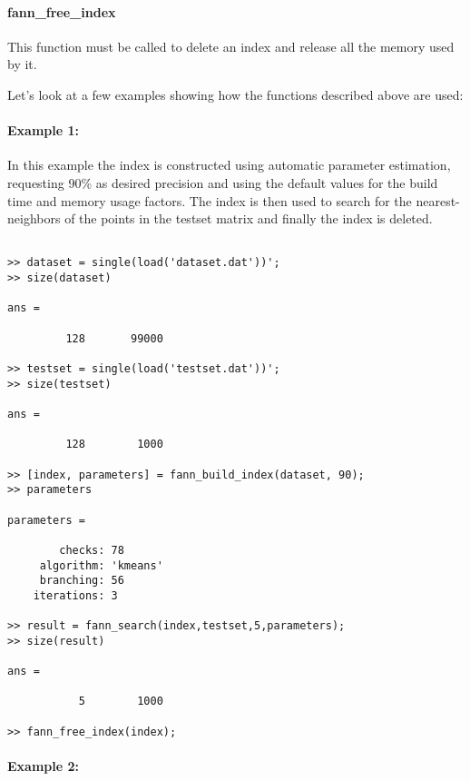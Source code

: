 \documentclass[letter,10pt]{article}
\begin{document}
\paragraph{fann\_free\_index}

This function must be called to delete an index and release all the memory used by it.

\bigskip

Let's look at a few examples showing how the functions described above are used:

\paragraph{Example 1:}

In this example the index is constructed using automatic parameter estimation, requesting 90\% as desired precision and using the default values for the build time and memory usage factors. The index is then used to search for the nearest-neighbors of the points in the testset matrix and finally the index is deleted.

\begin{Verbatim}[fontsize=\footnotesize,frame=single]

>> dataset = single(load('dataset.dat'))';
>> size(dataset)

ans =

         128       99000

>> testset = single(load('testset.dat'))';
>> size(testset)

ans =

         128        1000

>> [index, parameters] = fann_build_index(dataset, 90);
>> parameters

parameters = 

        checks: 78
     algorithm: 'kmeans'
     branching: 56
    iterations: 3

>> result = fann_search(index,testset,5,parameters);
>> size(result)

ans =

           5        1000

>> fann_free_index(index);

\end{Verbatim}




% 
% 


\paragraph{Example 2:}
\end{document}
